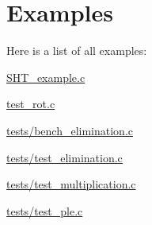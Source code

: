 \section{Examples}
Here is a list of all examples\+:\begin{DoxyCompactItemize}
\item 
\hyperlink{SHT_example_8c-example}{S\+H\+T\+\_\+example.\+c}
\item 
\hyperlink{test_rot_8c-example}{test\+\_\+rot.\+c}
\item 
\hyperlink{tests_2bench_elimination_8c-example}{tests/bench\+\_\+elimination.\+c}
\item 
\hyperlink{tests_2test_elimination_8c-example}{tests/test\+\_\+elimination.\+c}
\item 
\hyperlink{tests_2test_multiplication_8c-example}{tests/test\+\_\+multiplication.\+c}
\item 
\hyperlink{tests_2test_ple_8c-example}{tests/test\+\_\+ple.\+c}
\end{DoxyCompactItemize}
